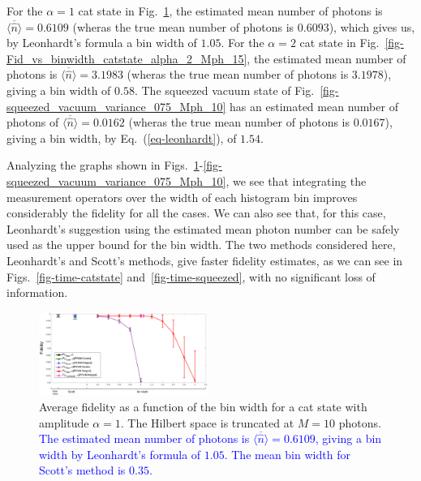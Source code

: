 \documentclass[
reprint,
superscriptaddress,
showpacs,
amsmath,
amssymb,
aps,
pra,
longbibliography
]{revtex4-1}
\providecommand{\editcolor}[2]{\textcolor{#1}{#2}}
\providecommand{\editcolor}[2]{#2}
\newcommand{\HV}[1]{\editcolor{blue}{#1}}
\begin{document}
For the $\alpha = 1$ cat state in
Fig.~\ref{fig-Fidelity_vs_binwidth_catstate_Mph_10_alpha_1}, the
estimated mean number of photons is $\overline{\langle \hat{n} \rangle}=0.6109$ (wheras the true mean number of photons is $0.6093$), which gives us, by Leonhardt's formula a bin width of $1.05$. For the $\alpha = 2$ cat state
in Fig.~\ref{fig-Fid_vs_binwidth_catstate_alpha_2_Mph_15}, the
estimated mean number of photons is $\overline{\langle \hat{n} \rangle}=3.1983$ (wheras the true mean number of photons is $3.1978$), giving a bin
width of $0.58$. The squeezed vacuum state of Fig.~\ref{fig-squeezed_vacuum_variance_075_Mph_10} has an estimated mean number of photons of $\overline{\langle \hat{n} \rangle}=0.0162$ (wheras the true
mean number of photons is $0.0167$), giving a bin width, by Eq.~(\ref{eq-leonhardt}), of $1.54$.

Analyzing the graphs shown in
Figs.~\ref{fig-Fidelity_vs_binwidth_catstate_Mph_10_alpha_1}-\ref{fig-squeezed_vacuum_variance_075_Mph_10},
we see that integrating the measurement operators over the width of
each histogram bin improves considerably the fidelity for all the
cases. We can also see that, for this case, Leonhardt's suggestion
using the estimated mean photon number can be safely
used as the upper bound for the bin width. The
two methods considered here, Leonhardt's and Scott's methods, give
faster fidelity estimates, as we can see in Figs.~\ref{fig-time-catstate}
and~\ref{fig-time-squeezed}, with no significant loss of
information.
   
\begin{figure}
  \includegraphics[width=0.49\textwidth]{catstate-alpha=1-10photons.eps}
  \caption{Average fidelity as a function of the bin width for a cat state
    with amplitude $\alpha = 1$. The Hilbert space is truncated at $M=10$
    photons. \HV{The estimated mean number of photons is $\overline{\langle \hat{n} \rangle}=0.6109$, giving a bin width by Leonhardt's formula of $1.05$. 
The mean bin width for Scott's method is $0.35$.}}
  \label{fig-Fidelity_vs_binwidth_catstate_Mph_10_alpha_1}
\end{figure}
\end{document}
